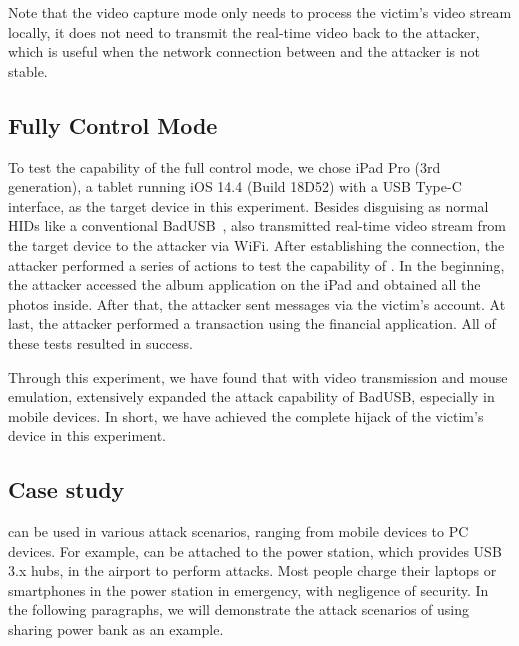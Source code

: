 Note that the video capture mode only needs to
process the victim's video stream locally, it does not need to transmit the real-time video back to the attacker, which is useful when the network connection between \tool and the attacker is not stable.

\subsection{Fully Control Mode}

To test the capability of the full control mode, we chose iPad Pro (3rd
	generation), a tablet running iOS 14.4 (Build 18D52) with a \ac{USB} Type-C interface, as the target
device in this experiment.  Besides disguising as normal \acp{HID} like a
conventional BadUSB~\cite{badusb}, \tool also transmitted real-time video
stream from the target device to the attacker via WiFi.  After establishing the connection, the attacker performed a series of actions to test the capability of
\tool. In the beginning, the attacker accessed the album application on the iPad and
obtained all the photos inside. After that, the attacker sent messages via the victim's
account. At last, the attacker performed a transaction using the
financial application. All of these tests resulted in success.

Through this experiment, we have found that with video transmission and mouse
emulation, \tool extensively expanded the attack capability of BadUSB,
especially in mobile devices. In short, we have achieved the complete hijack of the victim's
device in this experiment.

\subsection{Case study}
\label{subsec:case_study}
\tool can be used in various attack scenarios, ranging from mobile devices to PC devices.
For example, \tool can be attached to the power station, which provides USB 3.x hubs, in the airport to perform attacks.
Most people charge their laptops or smartphones in the power station in emergency, with negligence of security.
In the following paragraphs, we will demonstrate the attack scenarios of \tool using sharing power bank as an example.

